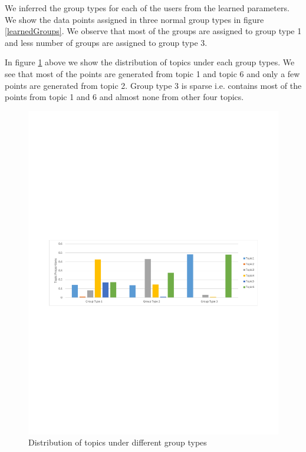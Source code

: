 \documentclass[letterpaper]{article}
\begin{document}
We inferred the group types for each of the users from the learned parameters. We show the data points assigned in three normal group types in figure \ref{learnedGroups}. We observe that most of the groups are assigned to group type 1 and less number of groups are assigned to group type 3.

In figure \ref{distTopic} above we show the distribution of topics under each group types. We see that most of the points are generated from topic 1 and topic 6 and only a few points are generated from topic 2. Group type 3 is sparse i.e. contains most of the points from topic 1 and 6 and almost none from other four topics.

\begin{figure}
\begin{center}
\includegraphics[bb = 55 320 560 470,clip=true,width=1\textwidth]{T3_K6_Chi.pdf}
\end{center}
\caption{Distribution of topics under different group types}\label{distTopic}
\end{figure}
\end{document}
